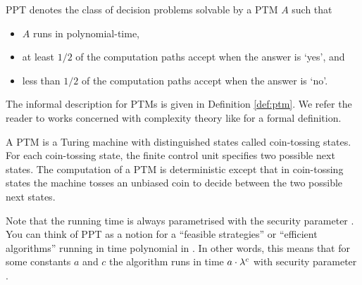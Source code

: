 \begin{definition}[\acl{PP}]\label{def:ppt}
\ac{PPT} denotes the class of decision problems solvable by a \ac{PTM} $A$ such that
\begin{itemize}
	\item $A$ runs in polynomial-time,
	\item at least $1/2$ of the computation paths accept when the answer is `yes', and
	\item less than $1/2$ of the computation paths accept when the answer is `no'.
\end{itemize}
\eod
\end{definition}

\noindent
The informal description for \aclp{PTM} is given in Definition \ref{def:ptm}.
We refer the reader to works concerned with complexity theory like \cite{santos1969,WaterlooComplexity} for a formal definition.

\begin{definition}\label{def:ptm}
A \ac{PTM} is a Turing machine with distinguished states called coin-tossing states.
For each coin-tossing state, the finite control unit specifies two possible next states.
The computation of a \ac{PTM} is deterministic except that in coin-tossing states the machine tosses an unbiased coin to decide between the two possible next states.
\end{definition}

\noindent
Note that the running time is always parametrised with the security parameter \secpar.
You can think of \ac{PPT} as a notion for a ``feasible strategies'' or ``efficient algorithms'' running in time polynomial in \secpar.
In other words, this means that for some constants $a$ and $c$ the algorithm runs in time $a\cdot \lambda^c$ with security parameter \secpar \cite{katz2008introduction}.

